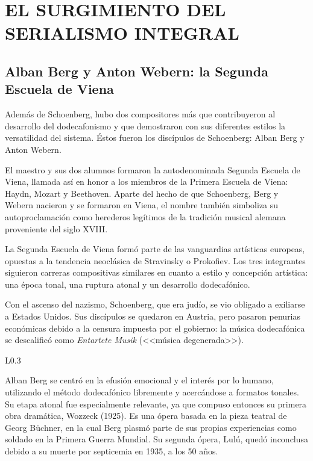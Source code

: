 \chapter{EL SURGIMIENTO DEL SERIALISMO INTEGRAL}
	\section{Alban Berg y Anton Webern: la Segunda Escuela de Viena}
	\label{berweb}
	Además de Schoenberg, hubo dos compositores más que contribuyeron al desarrollo del dodecafonismo y que demostraron con sus diferentes estilos la versatilidad del sistema. Éstos fueron los discípulos de Schoenberg: Alban Berg y Anton Webern. 
	
	El maestro y sus dos alumnos formaron la autodenominada Segunda Escuela de Viena, llamada así en honor a los miembros de la Primera Escuela de Viena: Haydn, Mozart y Beethoven. Aparte del hecho de que Schoenberg, Berg y Webern nacieron y se formaron en Viena, el nombre también simboliza su autoproclamación como herederos legítimos de la tradición musical alemana proveniente del siglo XVIII.
	
	La Segunda Escuela de Viena formó parte de las vanguardias artísticas europeas, opuestas a la tendencia neoclásica de Stravinsky o Prokofiev. Los tres integrantes siguieron carreras compositivas similares en cuanto a estilo y concepción artística: una época tonal, una ruptura atonal y un desarrollo dodecafónico.
	
	Con el ascenso del nazismo, Schoenberg, que era judío, se vio obligado a exiliarse a Estados Unidos. Sus discípulos se quedaron en Austria, pero pasaron penurias económicas debido a la censura impuesta por el gobierno: la música dodecafónica se descalificó como \emph{Entartete Musik} (<<música degenerada>>).
	
	\begin{wrapfigure}{L}{0.3\textwidth}
		\captionsetup{justification=centering, font=footnotesize}
		\vspace{0cm}
	\end{wrapfigure}
	Alban Berg se centró en la efusión emocional y el interés por lo humano, utilizando el método dodecafónico libremente y acercándose a formatos tonales. Su etapa atonal fue especialmente relevante, ya que compuso entonces su primera obra dramática, Wozzeck (1925). Es una ópera basada en la pieza teatral de Georg Büchner, en la cual Berg plasmó parte de sus propias experiencias como soldado en la Primera Guerra Mundial. Su segunda ópera, Lulú, quedó inconclusa debido a su muerte por septicemia en 1935, a los 50 años.
	
